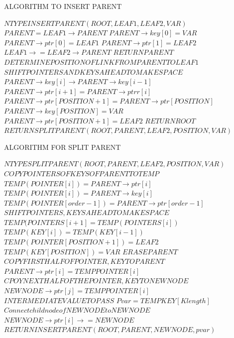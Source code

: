 \documentclass{article}
\begin{document}
\pagebreak
\begin{algorithm}
\caption{ALGORITHM TO INSERT PARENT}
\begin{algorithmic}
\STATE ${NTYPE INSERT PARENT(ROOT, LEAF1, LEAF2, VAR)} $
\STATE $ PARENT=LEAF1 \rightarrow PARENT $
\STATE $PARENT \rightarrow key[0]=VAR$
\STATE $ PARENT \rightarrow ptr[0]=LEAF1 $
\STATE $PARENT \rightarrow ptr[1]=LEAF2 $
\STATE $LEAF1\rightarrow =LEAF2\rightarrow PARENT $
\STATE $ RETURN PARENT $
\ENDIF
\STATE $ DETERMINE POSITION OF LINK FROM PARENT TO LEAF1 $
\STATE $ SHIFT POINTERS AND KEYS AHEAD TO MAKE SPACE $
\STATE $ PARENT\rightarrow key[i]\rightarrow PARENT \rightarrow key[i-1] $
\STATE $ PARENT \rightarrow ptr[i+1]=PARENT \rightarrow ptrr[i] $
\ENDFOR
\STATE $ PARENT \rightarrow ptr[POSITION+1]=PARENT \rightarrow ptr[POSITION] $
\STATE $ PARENT \rightarrow key[POSITION]=VAR $
\STATE $ PARENT \rightarrow ptr[POSITION+1]=LEAF 2 $
\STATE $ RETURN ROOT $
\STATE $ RETURN SPLIT PARENT(ROOT, PARENT, LEAF2, POSITION, VAR) $
\end{algorithmic}
\end{algorithm}

\pagebreak

\begin{algorithm}
\caption{ALGORITHM FOR SPLIT PARENT}
\begin{algorithmic}
\STATE ${NTYPE SPLIT PARENT(ROOT, PARENT, LEAF2, POSITION, VAR)} $
\STATE $COPY POINTERS OF KEYS OF PARENT TO TEMP $
\STATE $ TEMP(POINTER[i])=PARENT\rightarrow ptr[i] $
\STATE $ TEMP(POINTER[i])=PARENT\rightarrow key[i] $ 
\ENDFOR
\STATE $ TEMP(POINTER[order-1])=PARENT \rightarrow ptr[order-1] $
\STATE $ SHIFT POINTERS, KEYS AHEAD TO MAKE SPACE $
\STATE $ TEMP(POINTERS[i+1]=TEMP(POINTERS[i]) $
\STATE $ TEMP(KEY[i])=TEMP(KEY[i-1]) $
\STATE $ TEMP(POINTER[POSITION+1])=LEAF2 $
\ENDFOR
\STATE $ TEMP(KEY[POSITION])=VAR $
\STATE $ ERASE PARENT $ 
\STATE $ COPY FIRST HALF OF POINTER, KEY TO PARENT $
\STATE $ PARENT \rightarrow ptr[i]=TEMP POINTER[i] $
\ENDFOR 
\STATE $ CPOY NEXT HALF OF THE POINTER, KEY TO NEW NODE $
\STATE $ NEW NODE \rightarrow ptr[j]=TEMP POINTER[i] $
\STATE $ INTERMEDIATE VALUE TO PASS $ 
\STATE $ Pvar = TEMP KEY [Klength] $
\STATE $ Connect child node of NEW NODE to NEW NODE $
\ENDFOR
{}
\STATE $ NEW NODE \rightarrow ptr[i] \rightarrow =NEW NODE $
\ENDFOR
\STATE $ RETURN INSERT PARENT (ROOT, PARENT, NEW NODE, pvar ) $
\end  {algorithmic} 
\end {algorithm}
\pagebreak
\end{document}
